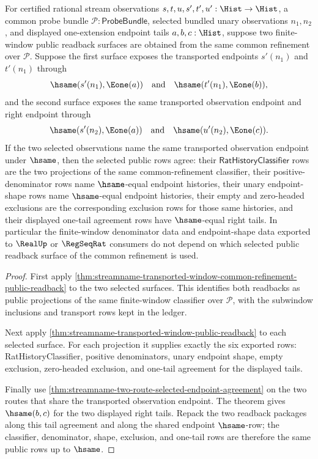 \begin{theorem}
\label{thm:streamname-common-refinement-denominator-shape-agreement}
For certified rational stream observations $s,t,u,s',t',u':\Hist\to\Hist$,
a common probe bundle $\mathcal{P}:\mathsf{ProbeBundle}$, selected bundled
unary observations $n_1,n_2$, and displayed one-extension endpoint tails
$a,b,c:\Hist$, suppose two finite-window public readback surfaces are obtained
from the same common refinement over $\mathcal{P}$. Suppose the first surface
exposes the transported endpoints $s'(n_1)$ and $t'(n_1)$ through
$$
\hsame(s'(n_1),\Eone(a))\quad\text{and}\quad
\hsame(t'(n_1),\Eone(b)),
$$
and the second surface exposes the same transported observation endpoint and
right endpoint through
$$
\hsame(s'(n_2),\Eone(a))\quad\text{and}\quad
\hsame(u'(n_2),\Eone(c)).
$$
If the two selected observations name the same transported observation
endpoint under $\hsame$, then the selected public rows agree: their
$\mathsf{RatHistoryClassifier}$ rows are the two projections of the same
common-refinement classifier, their positive-denominator rows name
$\hsame$-equal endpoint histories, their unary endpoint-shape rows name
$\hsame$-equal endpoint histories, their empty and zero-headed exclusions are
the corresponding exclusion rows for those same histories, and their displayed
one-tail agreement rows have $\hsame$-equal right tails. In particular the
finite-window denominator data and endpoint-shape data exported to
$\RealUp$ or $\RegSeqRat$ consumers do not depend on which selected public
readback surface of the common refinement is used.
\end{theorem}
\begin{proof}
First apply
\autoref{thm:streamname-transported-window-common-refinement-public-readback}
to the two selected surfaces. This identifies both readbacks as public
projections of the same finite-window classifier over $\mathcal{P}$, with the
subwindow inclusions and transport rows kept in the ledger.

Next apply
\autoref{thm:streamname-transported-window-public-readback} to each selected
surface. For each projection it supplies exactly the six exported rows:
RatHistoryClassifier, positive denominators, unary endpoint shape, empty
exclusion, zero-headed exclusion, and one-tail agreement for the displayed
tails.

Finally use
\autoref{thm:streamname-two-route-selected-endpoint-agreement} on the two
routes that share the transported observation endpoint. The theorem gives
$\hsame(b,c)$ for the two displayed right tails. Repack the two readback
packages along this tail agreement and along the shared endpoint
$\hsame$-row; the classifier, denominator, shape, exclusion, and one-tail rows
are therefore the same public rows up to $\hsame$.
\end{proof}

